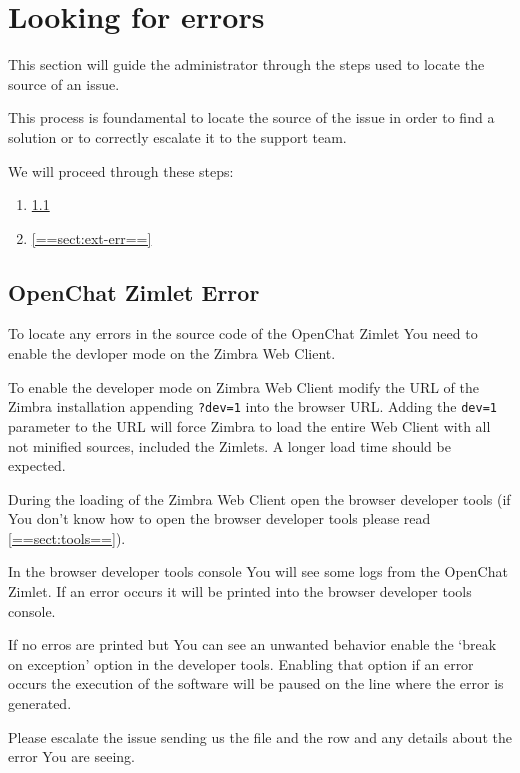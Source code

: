 \section{Looking for errors}

This section will guide the administrator through the steps used to locate the source of an issue.

This process is foundamental to locate the source of the issue in order to find a solution or to correctly escalate it
to the support team.

We will proceed through these steps:
\begin{enumerate}
    \item \ref{==sect:zim-err==}
    \item \ref{==sect:ext-err==}
\end{enumerate}

\subsection[Zimlet Error]{OpenChat Zimlet Error}
\label{==sect:zim-err==}
To locate any errors in the source code of the OpenChat Zimlet You need to enable the devloper mode on the Zimbra Web Client.

To enable the developer mode on Zimbra Web Client modify the URL of the Zimbra installation appending \verb+?dev=1+ into
the browser URL. Adding the \verb+dev=1+ parameter to the URL will force Zimbra to load the entire Web Client with all not
minified sources, included the Zimlets. A longer load time should be expected.

During the loading of the Zimbra Web Client open the browser developer tools (if You don't know how to open the browser
developer tools please read \ref{==sect:tools==}).

In the browser developer tools console You will see some logs from the OpenChat Zimlet. If an error occurs it will be printed into
the browser developer tools console.

If no erros are printed but You can see an unwanted behavior enable the `break on exception' option in the developer tools.
Enabling that option if an error occurs the execution of the software will be paused on the line where the error is generated.

Please escalate the issue sending us the file and the row and any details about the error You are seeing\footnotemark[1].

